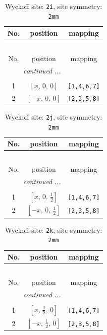 \documentclass[fleqn,8pt]{jsarticle}
\begin{document}
\renewcommand{\arraystretch}{1.2}
\begin{longtable}{ccc}
\caption{Wyckoff site: {\tt 2i}, site symmetry: {\tt 2mm}}
 \\
 \hline \hline
No. & position & mapping \\ \hline \endfirsthead

\multicolumn{2}{l}{\tablename\ \thetable{}} \\
 \hline \hline
No. & position & mapping \\ \hline \endhead

 \hline \hline
\multicolumn{2}{r}{\footnotesize\it continued ...} \\ \endfoot

 \hline \hline
\multicolumn{2}{r}{} \\ \endlastfoot

1 & $\left[ x,\, 0,\, 0 \right]$ & {\tt [1,4,6,7]} \\ \hline
2 & $\left[ - x,\, 0,\, 0 \right]$ & {\tt [2,3,5,8]} \\
\end{longtable}
\renewcommand{\arraystretch}{1.2}
\begin{longtable}{ccc}
\caption{Wyckoff site: {\tt 2j}, site symmetry: {\tt 2mm}}
 \\
 \hline \hline
No. & position & mapping \\ \hline \endfirsthead

\multicolumn{2}{l}{\tablename\ \thetable{}} \\
 \hline \hline
No. & position & mapping \\ \hline \endhead

 \hline \hline
\multicolumn{2}{r}{\footnotesize\it continued ...} \\ \endfoot

 \hline \hline
\multicolumn{2}{r}{} \\ \endlastfoot

1 & $\left[ x,\, 0,\, \frac{1}{2} \right]$ & {\tt [1,4,6,7]} \\ \hline
2 & $\left[ - x,\, 0,\, \frac{1}{2} \right]$ & {\tt [2,3,5,8]} \\
\end{longtable}
\renewcommand{\arraystretch}{1.2}
\begin{longtable}{ccc}
\caption{Wyckoff site: {\tt 2k}, site symmetry: {\tt 2mm}}
 \\
 \hline \hline
No. & position & mapping \\ \hline \endfirsthead

\multicolumn{2}{l}{\tablename\ \thetable{}} \\
 \hline \hline
No. & position & mapping \\ \hline \endhead

 \hline \hline
\multicolumn{2}{r}{\footnotesize\it continued ...} \\ \endfoot

 \hline \hline
\multicolumn{2}{r}{} \\ \endlastfoot

1 & $\left[ x,\, \frac{1}{2},\, 0 \right]$ & {\tt [1,4,6,7]} \\ \hline
2 & $\left[ - x,\, \frac{1}{2},\, 0 \right]$ & {\tt [2,3,5,8]} \\
\end{longtable}
\end{document}
